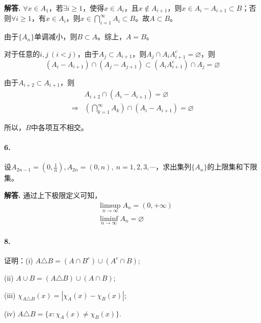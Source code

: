 \documentclass[12pt, a4paper, oneside]{ctexart}
\newenvironment{solution}{\par\noindent\textbf{解答. }}{\bigskip\par}
\begin{document}
\begin{solution}
    $\forall x\in A_1$，若$\exists i \geqslant 1$，使得$x\in A_i$，且$x\notin A_{i+1}$，则$x\in A_i-A_{i+1}\subset B$；否则$\forall i\geqslant 1$，有$x\in A_i$，则$x\in \bigcap_{i=1}^{\infty}A_i\subset B$。故$A\subset B$。

    由于$\{A_n\}$单调减小，则$B\subset A$。综上，$A=B$。

    对于任意的$i, j\ (i< j)$，由于$A_j\subset A_{i+1}$，则$A_j\cap A_iA_{i+1}^c = \varnothing$，则
    \begin{equation*}
        (A_i-A_{i+1})\cap(A_j-A_{j+1})\subset(A_iA_{i+1}^c)\cap A_j=\varnothing
    \end{equation*}

    由于$A_{i+2}\subset A_{i+1}$，则
    \begin{equation*}
        \begin{aligned}
            &A_{i+2}\cap(A_i-A_{i+1}) = \varnothing\\
            \Rightarrow&\left(\bigcap_{k=1}^{\infty}A_k\right)\cap(A_i-A_{i+1})=  \varnothing
        \end{aligned}
    \end{equation*}

    所以，$B$中各项互不相交。
\end{solution}
\paragraph{6.}设$A_{2n-1}=\left(0,\frac{1}{n}\right), A_{2n}=(0,n),\ n=1,2,3,\cdots$，求出集列$\{A_n\}$的上限集和下限集。
\begin{solution}
    通过上下极限定义可知，\begin{equation*}
        \begin{aligned}
            &\limsup_{n\rightarrow \infty}A_n = (0, +\infty)\\
            &\liminf_{n\rightarrow \infty}A_n = \varnothing
        \end{aligned}
    \end{equation*}
\end{solution}
\paragraph{8.}证明：(i) $A\triangle B = (A\cap B^c)\cup(A^c\cap B)$;

(ii) $A\cup B=(A\triangle B)\cup(A\cap B)$;

(iii) $\chi_{A\triangle B}(x) = |\chi_{A}(x)-\chi_B(x)|$;

(iv) $A\triangle B = \{x:\chi_A(x)\neq\chi_B(x)\}$.
\end{document}
